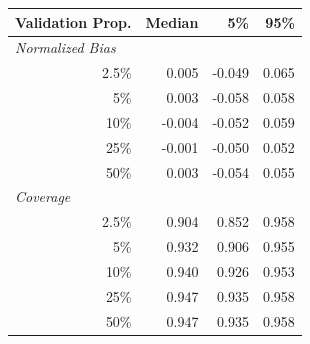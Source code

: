 
\begin{tabular}{r|rrr}
\toprule
Validation Prop. & Median & 5\% & 95\%\\
\midrule
\multicolumn{1}{l|}{\textit{Normalized Bias}}\\
2.5\% & 0.005 & -0.049 & 0.065\\
5\% & 0.003 & -0.058 & 0.058\\
10\% & -0.004 & -0.052 & 0.059\\
25\% & -0.001 & -0.050 & 0.052\\
50\% & 0.003 & -0.054 & 0.055\\
\midrule
%
\multicolumn{1}{l|}{\textit{Coverage}}\\
2.5\% & 0.904 & 0.852 & 0.958\\
5\% & 0.932 & 0.906 & 0.955\\
10\% & 0.940 & 0.926 & 0.953\\
25\% & 0.947 & 0.935 & 0.958\\
50\% & 0.947 & 0.935 & 0.958\\
\bottomrule
\end{tabular}
